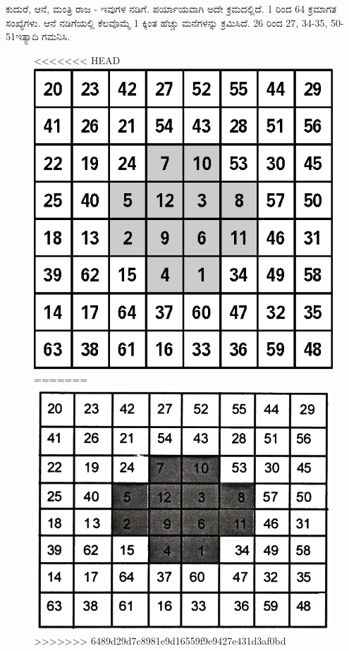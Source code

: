 ಕುದುರೆ, ಆನೆ, ಮಂತ್ರಿ ರಾಜ - ಇವುಗಳ ನಡಿಗೆ. ಪರ್ಯಾಯವಾಗಿ ಅದೇ ಕ್ರಮದಲ್ಲಿದೆ. 1 ರಿಂದ 64 ಕ್ರಮಾಗತ ಸಂಖ್ಯೆಗಳು. ಆನೆ ನಡಿಗೆಯಲ್ಲಿ ಕೆಲವೊಮ್ಮೆ 1 ಕ್ಕಿಂತ ಹೆಚ್ಚು ಮನೆಗಳನ್ನು ಕ್ರಮಿಸಿದೆ. 26 ರಿಂದ 27, 34-35, 50-51ಇತ್ಯಾದಿ ಗಮನಿಸಿ.
\begin{figure}[H]
<<<<<<< HEAD
\includegraphics{src/figures/chap6/fig6-14.eps}
=======
\includegraphics[scale=0.85]{src/figures/chap6/fig6.14.jpg}
>>>>>>> 6489d29d7c8981e9d16559f9e9427e431d3af0bd
\end{figure}

